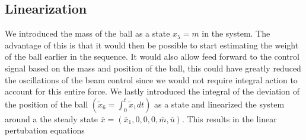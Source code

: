 \subsection{Linearization}

We introduced the mass of the ball as a state $x_{5}=m$ in the system. The advantage of this is that it would then be possible to start estimating the weight of the ball earlier in the sequence.
It would also allow feed forward to the control signal based on the mass and position of the ball, this could have greatly reduced the oscillations of the beam control since we would not require integral action to account for this entire force.
We lastly introduced the integral of the deviation of the position of the
ball $(\tilde{x}_{6}=\int_{0}^{t}\tilde{x}_{1}dt)$ as a state and linearized the system around a the steady state $\bar{x}=(\bar{x}_{1},0,0,0,\bar{m},\bar{u})$.
This results in the linear pertubation equations

